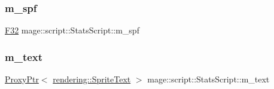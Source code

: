 \subsubsection{\texorpdfstring{m\+\_\+spf}{m\_spf}}
{\footnotesize\ttfamily \hyperlink{namespacemage_aa97e833b45f06d60a0a9c4fc22ae02c0}{F32} mage\+::script\+::\+Stats\+Script\+::m\+\_\+spf\hspace{0.3cm}{\ttfamily [private]}}

\hypertarget{classmage_1_1script_1_1_stats_script_a1fe11e7a3622fa5e3585fb6786e2d2e7}{}\label{classmage_1_1script_1_1_stats_script_a1fe11e7a3622fa5e3585fb6786e2d2e7} 
\subsubsection{\texorpdfstring{m\+\_\+text}{m\_text}}
{\footnotesize\ttfamily \hyperlink{classmage_1_1_proxy_ptr}{Proxy\+Ptr}$<$ \hyperlink{classmage_1_1rendering_1_1_sprite_text}{rendering\+::\+Sprite\+Text} $>$ mage\+::script\+::\+Stats\+Script\+::m\+\_\+text\hspace{0.3cm}{\ttfamily [private]}}

